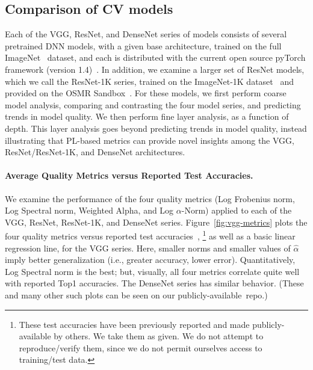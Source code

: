 \subsection{Comparison of CV models}
\label{sxn:cv}

Each of the VGG, ResNet, and DenseNet series of models consists of several pretrained DNN models, with a given base architecture, trained on the full ImageNet~\cite{imagenet} dataset, and each is distributed with the current open source pyTorch framework (version 1.4)~\cite{pytorch}.
In addition, we examine a larger set of ResNet models, which we call the ResNet-1K series, trained on the ImageNet-1K dataset~\cite{imagenet} and provided on the OSMR Sandbox~\cite{osmr}.
For these models, we first perform coarse model analysis, comparing and contrasting the four model series, and predicting trends in model quality.
We then perform fine layer analysis, as a function of depth.
This layer analysis goes beyond predicting trends in model quality, instead illustrating that PL-based metrics can provide novel insights among the VGG, ResNet/ResNet-1K, and DenseNet architectures. 


\paragraph{Average Quality Metrics versus Reported Test Accuracies.}

We examine the performance of the four quality metrics (Log Frobenius norm, Log Spectral norm, Weighted Alpha, and Log $\alpha$-Norm) applied to each of the VGG, ResNet, ResNet-1K, and DenseNet series.
%
Figure~\ref{fig:vgg-metrics} plots the four quality metrics versus reported test accuracies~\cite{pytorch},%
\footnote{These test accuracies have been previously reported and made publicly-available by others.  We take them as given.  We do not attempt to reproduce/verify them, since we do not permit ourselves access to training/test data.}
as well as a basic linear regression line, for the VGG series.
Here, smaller norms and smaller values of $\hat{\alpha}$ imply better generalization (i.e., greater accuracy, lower error). 
Quantitatively, Log Spectral norm is the best; but, visually, all four metrics correlate quite well with reported Top1 accuracies.
The DenseNet series has similar behavior.
(These and many other such plots can be seen on our publicly-available~repo.)

